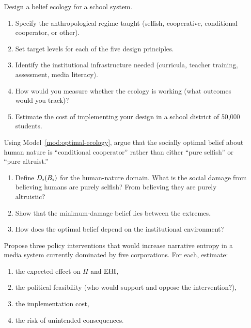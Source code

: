 \begin{exercise}
Design a belief ecology for a school system.
\begin{enumerate}[nosep]
  \item Specify the anthropological regime taught (selfish, cooperative, conditional cooperator, or other).
  \item Set target levels for each of the five design principles.
  \item Identify the institutional infrastructure needed (curricula, teacher training, assessment, media literacy).
  \item How would you measure whether the ecology is working (what outcomes would you track)?
  \item Estimate the cost of implementing your design in a school district of 50,000 students.
\end{enumerate}
\end{exercise}

\begin{exercise}
Using Model~\ref{mod:optimal-ecology}, argue that the socially optimal belief about human nature is ``conditional cooperator'' rather than either ``pure selfish'' or ``pure altruist.''
\begin{enumerate}[nosep]
  \item Define $D_i(B_{i})$ for the human-nature domain. What is the social damage from believing humans are purely selfish? From believing they are purely altruistic?
  \item Show that the minimum-damage belief lies between the extremes.
  \item How does the optimal belief depend on the institutional environment?
\end{enumerate}
\end{exercise}

\begin{exercise}
Propose three policy interventions that would increase narrative entropy in a media system currently dominated by five corporations.
For each, estimate:
\begin{enumerate}[nosep]
  \item the expected effect on $H$ and $\mathrm{EHI}$,
  \item the political feasibility (who would support and oppose the intervention?),
  \item the implementation cost,
  \item the risk of unintended consequences.
\end{enumerate}
\end{exercise}

